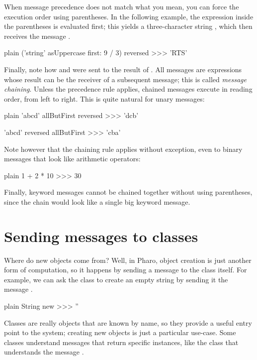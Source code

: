 \documentclass[10pt,twoside,english]{_support/latex/sbabook/sbabook}
\begin{document}
When message precedence does not match what you mean, you can force the execution order using parentheses.
In the following example, the expression inside the parentheses is evaluated first; this yields a three-character string , which then receives the message .

\begin{displaycode}{plain}
('string' asUppercase first: 9 / 3) reversed
>>> 'RTS'
\end{displaycode}

Finally, note how  and  were sent to the result of .
All messages are expressions whose result can be the receiver of a subsequent message; this is called \textit{message chaining}.
Unless the precedence rule applies, chained messages execute in reading order, from left to right.
This is quite natural for unary messages:

\begin{displaycode}{plain}
'abcd' allButFirst reversed
>>> 'dcb'

'abcd' reversed allButFirst
>>> 'cba'
\end{displaycode}

Note however that the chaining rule applies without exception, even to binary messages that look like arithmetic operators:

\begin{displaycode}{plain}
1 + 2 * 10
>>> 30
\end{displaycode}

Finally, keyword messages cannot be chained together without using parentheses, since the chain would look like a single big keyword message.
\section{Sending messages to classes}
Where do new objects come from?
Well, in Pharo, object creation is just another form of computation, so it happens by sending a message to the class itself.
For example, we can ask the class  to create an empty string by sending it the message .

\begin{displaycode}{plain}
String new
>>> ''
\end{displaycode}

Classes are really objects that are known by name, so they provide a useful entry point to the system; creating new objects is just a particular use-case.
Some classes understand messages that return specific instances, like the class  that understands the message .
\end{document}
